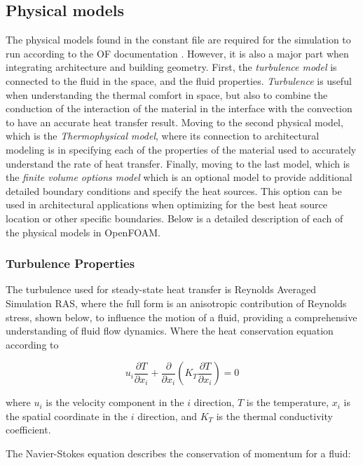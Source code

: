 \subsection{Physical models}
The physical models found in the constant file are required for the simulation to run according to the \gls{OF} documentation \cite{OFD}. However, it is also a major part when integrating architecture and building geometry. First, the \textit{turbulence model} is connected to the fluid in the space, and the fluid properties. \textit{Turbulence} is useful when understanding the thermal comfort in space, but also to combine the conduction of the interaction of the material in the interface with the convection to have an accurate heat transfer result. Moving to the second physical model, which is the \textit{Thermophysical model}, where its connection to architectural modeling is in specifying each of the properties of the material used to accurately understand the rate of heat transfer. Finally, moving to the last model, which is the \textit{finite volume options model} which is an optional model to provide additional detailed boundary conditions and specify the heat sources. This option can be used in architectural applications when optimizing for the best heat source location or other specific boundaries. Below is a detailed description of each of the physical models in OpenFOAM.


\subsubsection{Turbulence Properties}
The turbulence used for steady-state heat transfer is Reynolds Averaged Simulation \gls{RAS}, where the full form is an anisotropic contribution of Reynolds stress, shown below, to influence the motion of a fluid, providing a comprehensive understanding of fluid flow dynamics. Where the heat conservation equation according to \cite{hce}

\begin{equation}
u_i \frac{\partial T}{\partial x_i} + \frac{\partial}{\partial x_i}(K_T \frac{\partial T}{\partial x_i}) = 0 \label{eq:heat}
\end{equation}

where \(u_i\) is the velocity component in the \(i\) direction, \(T\) is the temperature, \(x_i\) is the spatial coordinate in the \(i\) direction, and \(K_T\) is the thermal conductivity coefficient.

The Navier-Stokes equation describes the conservation of momentum for a fluid:

